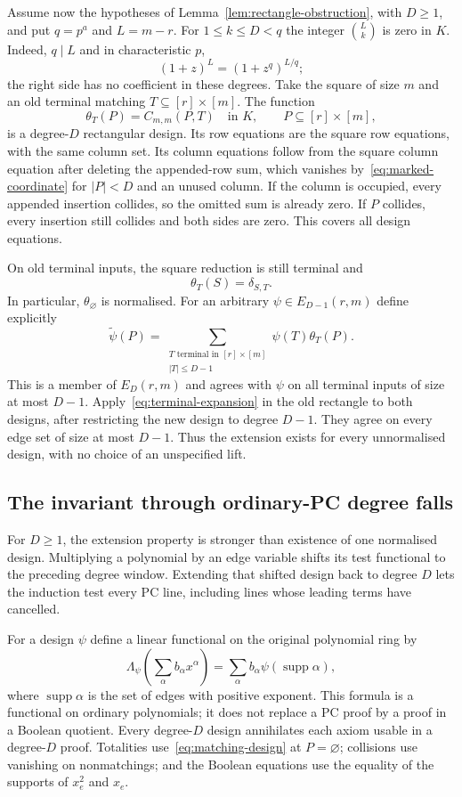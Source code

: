 \documentclass[11pt,a4paper]{article}
\theoremstyle{definition}\newtheorem{definition}[theorem]{Definition}
\theoremstyle{remark}\newtheorem{remark}[theorem]{Remark}
\begin{document}
Assume now the hypotheses of Lemma~\ref{lem:rectangle-obstruction}, with
$D\geq1$, and put $q=p^a$ and $L=m-r$.  For $1\leq k\leq D<q$ the
integer $\binom{L}{k}$ is zero in $K$.  Indeed, $q\mid L$ and in
characteristic $p$,
\[
 (1+z)^L=(1+z^q)^{L/q};
\]
the right side has no coefficient in these degrees.  Take the square
of size $m$ and an old terminal matching $T\subseteq[r]\times[m]$.
The function
\[
 \theta_T(P)=C_{m,m}(P,T)\quad\text{in }K,
       \qquad P\subseteq[r]\times[m],
\]
is a degree-$D$ rectangular design.  Its row equations are the square
row equations, with the same column set.  Its column equations follow
from the square column equation after deleting the appended-row sum,
which vanishes by~\eqref{eq:marked-coordinate} for $|P|<D$ and an
unused column.  If the column is occupied, every appended insertion
collides, so the omitted sum is already zero.  If $P$ collides, every
insertion still collides and both sides are zero.  This covers all
design equations.

On old terminal inputs, the square reduction is still terminal and
\[
 \theta_T(S)=\delta_{S,T}.
\]
In particular, $\theta_{\varnothing}$ is normalised.  For an arbitrary
$\psi\in E_{D-1}(r,m)$ define explicitly
\[
 \widetilde\psi(P)=
    \sum_{\substack{T\text{ terminal in }[r]\times[m]\\|T|\leq D-1}}
                     \psi(T)\theta_T(P).
\]
This is a member of $E_D(r,m)$ and agrees with $\psi$ on all terminal
inputs of size at most $D-1$.  Apply~\eqref{eq:terminal-expansion} in the
old rectangle to both designs, after restricting the new design to
degree $D-1$.  They agree on every edge set of size at most $D-1$.
Thus the extension exists for every unnormalised design, with no
choice of an unspecified lift.

\subsection{The invariant through ordinary-PC degree falls}
For $D\ge1$, the extension property is stronger than existence of one normalised
design. Multiplying a polynomial by an edge variable shifts its test
functional to the preceding degree window. Extending that shifted
design back to degree $D$ lets the induction test every PC line,
including lines whose leading terms have cancelled.

For a design $\psi$ define a linear functional on the original polynomial
ring by
\[
 \Lambda_\psi\!\left(\sum_\alpha b_\alpha x^\alpha\right)
      =\sum_\alpha b_\alpha\psi(\operatorname{supp}\alpha),
\]
where $\operatorname{supp}\alpha$ is the set of edges with positive
exponent.  This formula is a functional on ordinary polynomials; it
does not replace a PC proof by a proof in a Boolean quotient.
Every degree-$D$ design annihilates each axiom usable in a degree-$D$
proof.  Totalities use~\eqref{eq:matching-design} at $P=\varnothing$;
collisions use vanishing on nonmatchings; and the Boolean equations
use the equality of the supports of $x_e^2$ and $x_e$.
\end{document}
